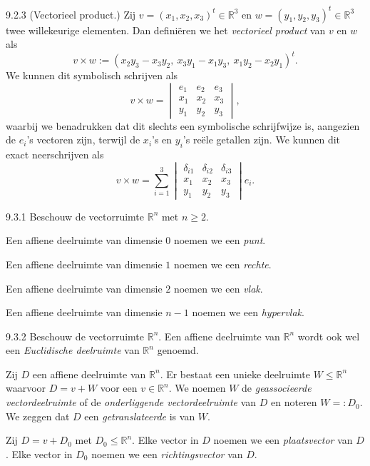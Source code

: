 \begin{res}{9.2.3}
\textup{(Vectorieel product.)} Zij $v=(x_1,x_2,x_3)^t\in\mathbb R^3$ en $w=(y_1,y_2,y_3)^t\in\mathbb R^3$ twee willekeurige elementen. Dan defini\"eren we het \textit{vectorieel product} van $v$ en $w$ als
\[
v\times w := (x_2y_3-x_3y_2,\ x_3y_1-x_1y_3,\ x_1y_2-x_2y_1)^t. \tag{9.1}
\]
We kunnen dit symbolisch schrijven als
\[
v\times w = \begin{vmatrix} e_1&e_2&e_3\\ x_1&x_2&x_3\\ y_1&y_2&y_3\end{vmatrix},
\]
waarbij we benadrukken dat dit slechts een symbolische schrijfwijze is, aangezien de $e_i$'s vectoren zijn, terwijl de $x_i$'s en $y_i$'s re\"ele getallen zijn. We kunnen dit exact neerschrijven als
\[
v\times w=\sum_{i=1}^3 \begin{vmatrix}\delta_{i1}&\delta_{i2}&\delta_{i3}\\ x_1&x_2&x_3\\ y_1&y_2&y_3\end{vmatrix} e_i. \tag{9.2}
\]
\end{res}

\begin{res}{9.3.1}
Beschouw de vectorruimte $\mathbb R^n$ met $n\ge2$.
\begin{myenum}
\item Een affiene deelruimte van dimensie $0$ noemen we een \textit{punt}.
\item Een affiene deelruimte van dimensie $1$ noemen we een \textit{rechte}.
\item Een affiene deelruimte van dimensie $2$ noemen we een \textit{vlak}.
\item Een affiene deelruimte van dimensie $n-1$ noemen we een \textit{hypervlak}.
\end{myenum}
\end{res}

\begin{res}{9.3.2}
Beschouw de vectorruimte $\mathbb R^n$. Een affiene deelruimte van $\mathbb R^n$ wordt ook wel een \textit{Euclidische deelruimte} van $\mathbb R^n$ genoemd.
\begin{myenum}
\item Zij $D$ een affiene deelruimte van $\mathbb R^n$. Er bestaat een unieke deelruimte $W\le\mathbb R^n$ waarvoor $D=v+W$ voor een $v\in\mathbb R^n$. We noemen $W$ de \textit{geassocieerde vectordeelruimte} of de \textit{onderliggende vectordeelruimte} van $D$ en noteren $W=:D_0$. We zeggen dat $D$ een \textit{getranslateerde} is van $W$.
\item Zij $D=v+D_0$ met $D_0\le\mathbb R^n$. Elke vector in $D$ noemen we een \textit{plaatsvector} van $D$. Elke vector in $D_0$ noemen we een \textit{richtingsvector} van $D$.
\end{myenum}
\end{res}

